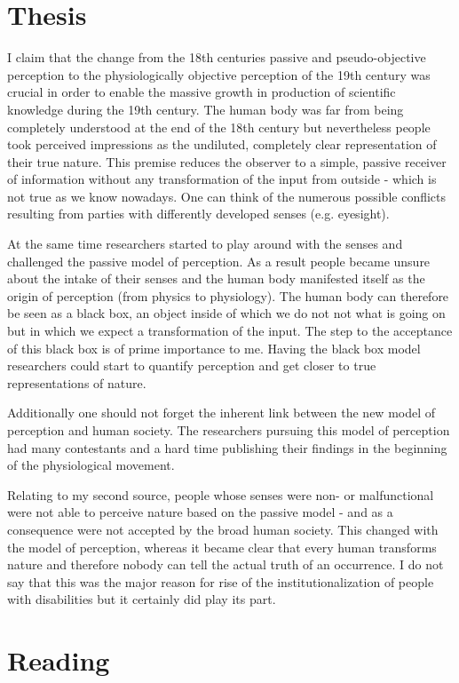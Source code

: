 \documentclass[12pt,a4paper]{article}
\begin{document}
\section*{Thesis}

I claim that the change from the 18th centuries passive and pseudo-objective
perception to the physiologically objective perception of the 19th century was crucial in order to
enable the massive growth in production of scientific knowledge during the 19th century.
The human body was far from being completely understood at the end of the 18th century but
nevertheless people took perceived impressions as the undiluted, completely clear representation of
their true nature.
This premise reduces the observer to a simple, passive receiver of information without any transformation
of the input from outside - which is not true as we know nowadays.
One can think of the numerous possible conflicts resulting from parties with differently developed
senses (e.g. eyesight).

At the same time researchers started to play around with the senses and challenged the passive model
of perception. As a result people became unsure about the intake of their senses and the human body
manifested itself as the origin of perception (from physics to physiology). The human body can therefore be
seen as a black box, an object inside of which we do not not what is going on but in which we expect a
transformation of the input. The step to the acceptance of this black box is of prime importance to me.
Having the black box model researchers could start to quantify perception and get closer to true
representations of nature.

Additionally one should not forget the inherent link between the new model of perception and human society.
The researchers pursuing this model of perception had many contestants and a hard time publishing
their findings in the beginning of the physiological movement.

Relating to my second source, people whose senses were non- or malfunctional were not able to perceive nature
based on the passive model - and as a consequence were not accepted by the broad human society. This
changed with the model of perception, whereas it became clear that every human transforms nature and
therefore nobody can tell the actual truth of an occurrence. I do not say that this was the major reason for
rise of the institutionalization of people with disabilities but it certainly did play its part.

\section*{Reading}
\end{document}
